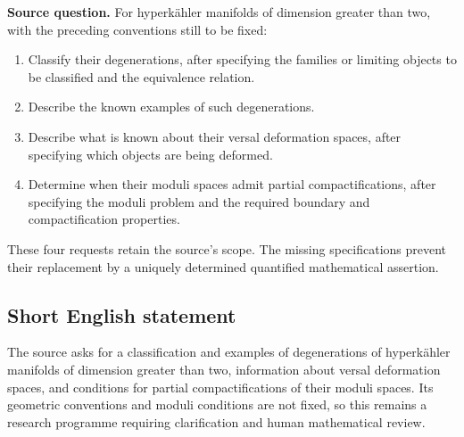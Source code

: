 \documentclass[11pt]{article}
\begin{document}
\textbf{Source question.} For hyperkähler manifolds of dimension greater than two, with the preceding conventions still to be fixed:
\begin{enumerate}
\item Classify their degenerations, after specifying the families or limiting objects to be classified and the equivalence relation.
\item Describe the known examples of such degenerations.
\item Describe what is known about their versal deformation spaces, after specifying which objects are being deformed.
\item Determine when their moduli spaces admit partial compactifications, after specifying the moduli problem and the required boundary and compactification properties.
\end{enumerate}
These four requests retain the source's scope. The missing specifications prevent their replacement by a uniquely determined quantified mathematical assertion.
\subsection{Short English statement}
The source asks for a classification and examples of degenerations of hyperkähler manifolds of dimension greater than two, information about versal deformation spaces, and conditions for partial compactifications of their moduli spaces. Its geometric conventions and moduli conditions are not fixed, so this remains a research programme requiring clarification and human mathematical review.
\end{document}

